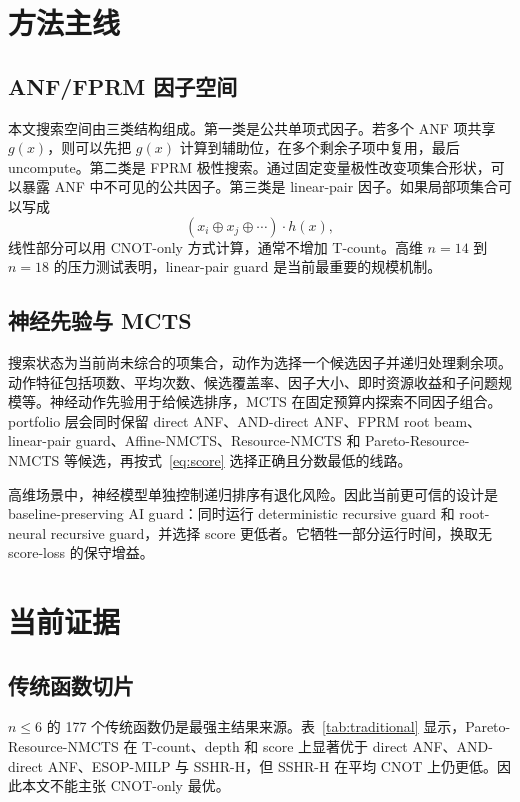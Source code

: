 \documentclass[UTF8,fontset=macnew,11pt]{ctexart}
\newcommand{\method}{Resource-NMCTS}
\newcommand{\pareto}{Pareto-Resource-NMCTS}
\newcommand{\mcts}{\ensuremath{\mathrm{MCTS}}}
\begin{document}
\section{方法主线}

\subsection{ANF/FPRM 因子空间}

本文搜索空间由三类结构组成。第一类是公共单项式因子。若多个 ANF 项共享 $g(x)$，则可以先把 $g(x)$ 计算到辅助位，在多个剩余子项中复用，最后 uncompute。第二类是 FPRM 极性搜索。通过固定变量极性改变项集合形状，可以暴露 ANF 中不可见的公共因子。第三类是 linear-pair 因子。如果局部项集合可以写成
\[
  (x_i\oplus x_j\oplus\cdots)\cdot h(x),
\]
线性部分可以用 CNOT-only 方式计算，通常不增加 T-count。高维 $n=14$ 到 $n=18$ 的压力测试表明，linear-pair guard 是当前最重要的规模机制。

\subsection{神经先验与 MCTS}

搜索状态为当前尚未综合的项集合，动作为选择一个候选因子并递归处理剩余项。动作特征包括项数、平均次数、候选覆盖率、因子大小、即时资源收益和子问题规模等。神经动作先验用于给候选排序，\mcts{} 在固定预算内探索不同因子组合。portfolio 层会同时保留 direct ANF、AND-direct ANF、FPRM root beam、linear-pair guard、Affine-NMCTS、\method{} 和 \pareto{} 等候选，再按式~\eqref{eq:score} 选择正确且分数最低的线路。

高维场景中，神经模型单独控制递归排序有退化风险。因此当前更可信的设计是 baseline-preserving AI guard：同时运行 deterministic recursive guard 和 root-neural recursive guard，并选择 score 更低者。它牺牲一部分运行时间，换取无 score-loss 的保守增益。

\section{当前证据}

\subsection{传统函数切片}

$n\leq6$ 的 177 个传统函数仍是最强主结果来源。表~\ref{tab:traditional} 显示，\pareto{} 在 T-count、depth 和 score 上显著优于 direct ANF、AND-direct ANF、ESOP-MILP 与 SSHR-H，但 SSHR-H 在平均 CNOT 上仍更低。因此本文不能主张 CNOT-only 最优。
\end{document}
